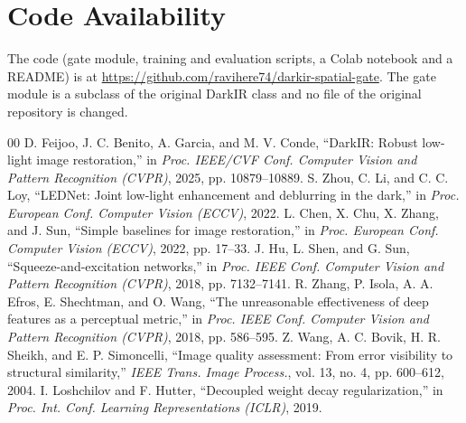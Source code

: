 \documentclass[conference]{IEEEtran}
\begin{document}
\section*{Code Availability}
The code (gate module, training and evaluation scripts, a Colab notebook and a README) is at \url{https://github.com/ravihere74/darkir-spatial-gate}. The gate module is a subclass of the original DarkIR class and no file of the original repository is changed.

\begin{thebibliography}{00}
 D. Feijoo, J. C. Benito, A. Garcia, and M. V. Conde, ``DarkIR: Robust low-light image restoration,'' in \textit{Proc. IEEE/CVF Conf. Computer Vision and Pattern Recognition (CVPR)}, 2025, pp. 10879--10889.
 S. Zhou, C. Li, and C. C. Loy, ``LEDNet: Joint low-light enhancement and deblurring in the dark,'' in \textit{Proc. European Conf. Computer Vision (ECCV)}, 2022.
 L. Chen, X. Chu, X. Zhang, and J. Sun, ``Simple baselines for image restoration,'' in \textit{Proc. European Conf. Computer Vision (ECCV)}, 2022, pp. 17--33.
 J. Hu, L. Shen, and G. Sun, ``Squeeze-and-excitation networks,'' in \textit{Proc. IEEE Conf. Computer Vision and Pattern Recognition (CVPR)}, 2018, pp. 7132--7141.
 R. Zhang, P. Isola, A. A. Efros, E. Shechtman, and O. Wang, ``The unreasonable effectiveness of deep features as a perceptual metric,'' in \textit{Proc. IEEE Conf. Computer Vision and Pattern Recognition (CVPR)}, 2018, pp. 586--595.
 Z. Wang, A. C. Bovik, H. R. Sheikh, and E. P. Simoncelli, ``Image quality assessment: From error visibility to structural similarity,'' \textit{IEEE Trans. Image Process.}, vol. 13, no. 4, pp. 600--612, 2004.
 I. Loshchilov and F. Hutter, ``Decoupled weight decay regularization,'' in \textit{Proc. Int. Conf. Learning Representations (ICLR)}, 2019.
\end{thebibliography}
\end{document}
